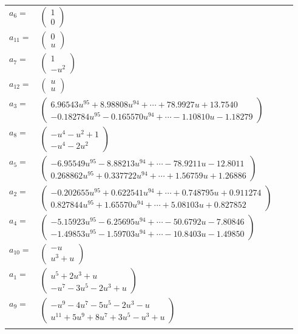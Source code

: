 \documentclass[1p]{elsarticle_modified}
\theoremstyle{definition}
\begin{document}
\begin{tabular}{m{7pt} m{180pt} m{7pt} m{180pt} }
\flushright $a_{6}=$&$\begin{pmatrix}1\\0\end{pmatrix}$ \\
\flushright $a_{11}=$&$\begin{pmatrix}0\\u\end{pmatrix}$ \\
\flushright $a_{7}=$&$\begin{pmatrix}1\\- u^2\end{pmatrix}$ \\
\flushright $a_{12}=$&$\begin{pmatrix}u\\u\end{pmatrix}$ \\
\flushright $a_{3}=$&$\begin{pmatrix}6.96543 u^{95}+8.98808 u^{94}+\cdots+78.9927 u+13.7540\\-0.182784 u^{95}-0.165570 u^{94}+\cdots-1.10810 u-1.18279\end{pmatrix}$ \\
\flushright $a_{8}=$&$\begin{pmatrix}- u^4- u^2+1\\- u^4-2 u^2\end{pmatrix}$ \\
\flushright $a_{5}=$&$\begin{pmatrix}-6.95549 u^{95}-8.88213 u^{94}+\cdots-78.9211 u-12.8011\\0.268862 u^{95}+0.337722 u^{94}+\cdots+1.56759 u+1.26886\end{pmatrix}$ \\
\flushright $a_{2}=$&$\begin{pmatrix}-0.202655 u^{95}+0.622541 u^{94}+\cdots+0.748795 u+0.911274\\0.827844 u^{95}+1.65570 u^{94}+\cdots+5.08103 u+0.827852\end{pmatrix}$ \\
\flushright $a_{4}=$&$\begin{pmatrix}-5.15923 u^{95}-6.25695 u^{94}+\cdots-50.6792 u-7.80846\\-1.49853 u^{95}-1.59703 u^{94}+\cdots-10.8403 u-1.49850\end{pmatrix}$ \\
\flushright $a_{10}=$&$\begin{pmatrix}- u\\u^3+u\end{pmatrix}$ \\
\flushright $a_{1}=$&$\begin{pmatrix}u^5+2 u^3+u\\- u^7-3 u^5-2 u^3+u\end{pmatrix}$ \\
\flushright $a_{9}=$&$\begin{pmatrix}- u^9-4 u^7-5 u^5-2 u^3- u\\u^{11}+5 u^9+8 u^7+3 u^5- u^3+u\end{pmatrix}$\\&\end{tabular}
\end{document}
